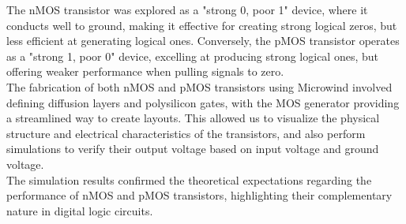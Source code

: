 \documentclass[a4paper,12pt]{article}
\begin{document}
	The nMOS transistor was explored as a "strong 0, poor 1" device, where it conducts well to ground, making it effective for creating strong logical zeros, but less efficient at generating logical ones. Conversely, the pMOS transistor operates as a "strong 1, poor 0" device, excelling at producing strong logical ones, but offering weaker performance when pulling signals to zero.\\
	
	The fabrication of both nMOS and pMOS transistors using Microwind involved defining diffusion layers and polysilicon gates, with the MOS generator providing a streamlined way to create layouts. This allowed us to visualize the physical structure and electrical characteristics of the transistors, and also perform simulations to verify their output voltage based on input voltage and ground voltage.\\
	
	The simulation results confirmed the theoretical expectations regarding the performance of nMOS and pMOS transistors, highlighting their complementary nature in digital logic circuits.
	
\end{document}

